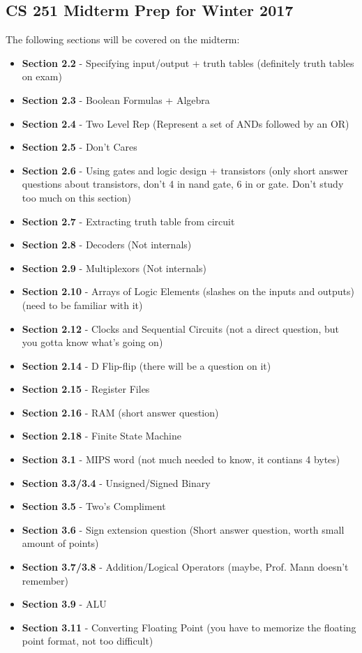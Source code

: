 \documentclass{report}
\begin{document}
\subsection*{CS 251 Midterm Prep for Winter 2017}
The following sections will be covered on the midterm:
\begin{itemize}
\item \textbf{Section 2.2} - Specifying input/output + truth tables (definitely truth tables on exam)
\item \textbf{Section 2.3} - Boolean Formulas + Algebra
\item \textbf{Section 2.4} - Two Level Rep (Represent a set of ANDs followed by an OR)
\item \textbf{Section 2.5} - Don't Cares
\item \textbf{Section 2.6} - Using gates and logic design + transistors (only short answer questions about transistors, don't 4 in nand gate, 6 in or gate. Don't study too much on this section)
\item \textbf{Section 2.7} - Extracting truth table from circuit
\item \textbf{Section 2.8} - Decoders (Not internals)
\item \textbf{Section 2.9} - Multiplexors (Not internals)
\item \textbf{Section 2.10} - Arrays of Logic Elements (slashes on the inputs and outputs) (need to be familiar with it)
\item \textbf{Section 2.12} - Clocks and Sequential Circuits (not a direct question, but you gotta know what's going on)
\item \textbf{Section 2.14} - D Flip-flip (there will be a question on it)
\item \textbf{Section 2.15} - Register Files
\item \textbf{Section 2.16} - RAM (short answer question)
\item \textbf{Section 2.18} - Finite State Machine
\item \textbf{Section 3.1} - MIPS word (not much needed to know, it contians 4 bytes)
\item \textbf{Section 3.3/3.4} - Unsigned/Signed Binary
\item \textbf{Section 3.5} - Two's Compliment
\item \textbf{Section 3.6} - Sign extension question (Short answer question, worth small amount of points)
\item \textbf{Section 3.7/3.8} - Addition/Logical Operators (maybe, Prof. Mann doesn't remember)
\item \textbf{Section 3.9} - ALU
\item \textbf{Section 3.11} - Converting Floating Point (you have to memorize the floating point format, not too difficult)
\end{itemize}
\end{document}
